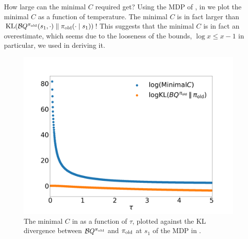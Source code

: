 \documentclass[\main/thesis.tex]{subfiles}
\begin{document}
How large can the minimal $C$ required get? Using the MDP of , in  we plot the minimal $C$ as a function of temperature. The minimal $C$ is in fact larger than $\mathrm{KL}(\mathcal{B}Q^{\pi_\mathrm{old}}(s_1, \cdot) \parallel {\pi_\mathrm{old}}(\cdot \mid s_1))$! This suggests that the minimal $C$ is in fact an overestimate, which seems due to the looseness of the bounds, $\log x \leq x - 1$ in particular, we used in deriving it. 
\begin{figure}[!htb]
    \centering
    \includegraphics[width=\linewidth]{figs/theory/prop3.png}
    \caption{The minimal $C$ in  as a function of $\tau$, plotted against the KL divergence between $\mathcal{B}Q^{\pi_\mathrm{old}}$ and ${\pi_\mathrm{old}}$ at $s_1$ of the MDP in .}
    \label{fig:prop3-c}
\end{figure}
\end{document}
